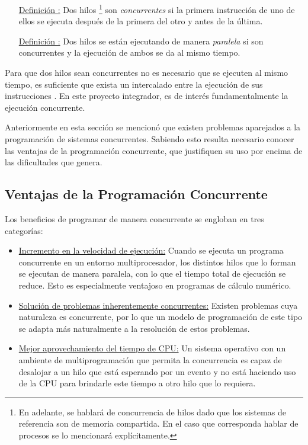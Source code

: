 \begin{itemize}
	\item [\underline{Definición \thedefinitionsCounter :} ] Dos hilos
	\footnote{En adelante, se hablará de concurrencia de hilos dado que los
	sistemas de referencia son de memoria compartida. En el caso que corresponda
	hablar de procesos se lo mencionará explícitamente.} son \textit{concurrentes}
	si la primera instrucción de uno de ellos se ejecuta después de la primera del
	otro y antes de la última.
	\item [\underline{Definición \thedefinitionsCounter :} ] Dos hilos 	se están
	ejecutando de manera \textit{paralela} si son concurrentes y la ejecución de
	ambos se da al mismo tiempo.
\end{itemize}

Para que dos hilos sean concurrentes no es necesario que se ejecuten al mismo
tiempo, es suficiente que exista un intercalado entre la ejecución de sus
instrucciones \cite{PalmaConcurrente}. En este proyecto integrador, es de
interés fundamentalmente la ejecución concurrente.

Anteriormente en esta sección se mencionó que existen problemas aparejados a la
programación de sistemas concurrentes. Sabiendo esto resulta necesario conocer
las ventajas de la programación concurrente, que justifiquen su uso por encima de
las dificultades que genera.

\subsection{Ventajas de la Programación Concurrente}

Los beneficios de programar de manera concurrente se engloban en tres
categorías:

\begin{itemize}
	\item \underline{Incremento en la velocidad de ejecución:} Cuando se ejecuta un
	programa concurrente en un entorno multiprocesador, los distintos hilos que
	lo forman se ejecutan de manera paralela, con lo que el tiempo total de
	ejecución se reduce. Esto es especialmente ventajoso en programas de cálculo
	numérico.
	\item \underline{Solución de problemas inherentemente concurrentes:} Existen
	problemas cuya naturaleza es concurrente, por lo que un modelo de programación
	de este tipo se adapta más naturalmente a la resolución de estos problemas.
	\item \underline{Mejor aprovechamiento del tiempo de CPU:} Un sistema operativo
	con un ambiente de multiprogramación que permita la concurrencia es capaz de
	desalojar a un hilo que está esperando por un evento y no está haciendo uso
	de la CPU para brindarle este tiempo a otro hilo que lo requiera.
\end{itemize}

